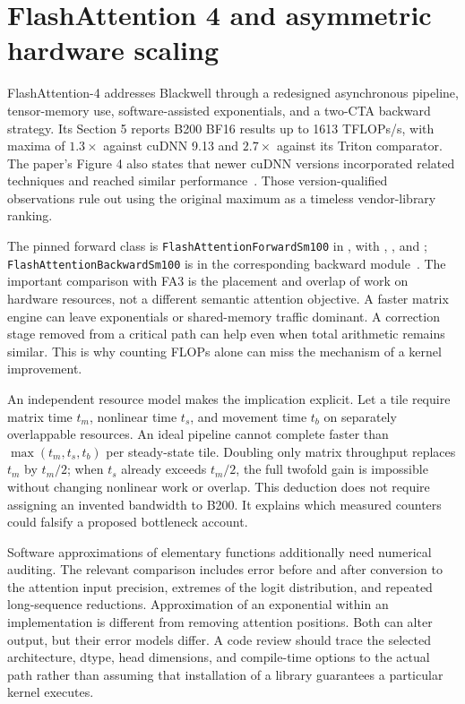 \section{FlashAttention 4 and asymmetric hardware scaling}
\label{sec:C04:frontier}
FlashAttention-4 addresses Blackwell through a redesigned asynchronous pipeline, tensor-memory use, software-assisted exponentials, and a two-CTA backward strategy. Its Section 5 reports B200 BF16 results up to 1613 TFLOPs/s, with maxima of $1.3\times$ against cuDNN 9.13 and $2.7\times$ against its Triton comparator. The paper's Figure 4 also states that newer cuDNN versions incorporated related techniques and reached similar performance~\cite{rewrite_fa4}. Those version-qualified observations rule out using the original maximum as a timeless vendor-library ranking.

The pinned forward class is \texttt{FlashAttention\allowbreak ForwardSm100} in , with , , and ; \texttt{FlashAttention\allowbreak BackwardSm100} is in the corresponding backward module~\cite{repo_flashattention}. The important comparison with FA3 is the placement and overlap of work on hardware resources, not a different semantic attention objective. A faster matrix engine can leave exponentials or shared-memory traffic dominant. A correction stage removed from a critical path can help even when total arithmetic remains similar. This is why counting FLOPs alone can miss the mechanism of a kernel improvement.

An independent resource model makes the implication explicit. Let a tile require matrix time $t_m$, nonlinear time $t_s$, and movement time $t_b$ on separately overlappable resources. An ideal pipeline cannot complete faster than $\max(t_m,t_s,t_b)$ per steady-state tile. Doubling only matrix throughput replaces $t_m$ by $t_m/2$; when $t_s$ already exceeds $t_m/2$, the full twofold gain is impossible without changing nonlinear work or overlap. This deduction does not require assigning an invented bandwidth to B200. It explains which measured counters could falsify a proposed bottleneck account.

Software approximations of elementary functions additionally need numerical auditing. The relevant comparison includes error before and after conversion to the attention input precision, extremes of the logit distribution, and repeated long-sequence reductions. Approximation of an exponential within an implementation is different from removing attention positions. Both can alter output, but their error models differ. A code review should trace the selected architecture, dtype, head dimensions, and compile-time options to the actual path rather than assuming that installation of a library guarantees a particular kernel executes.


